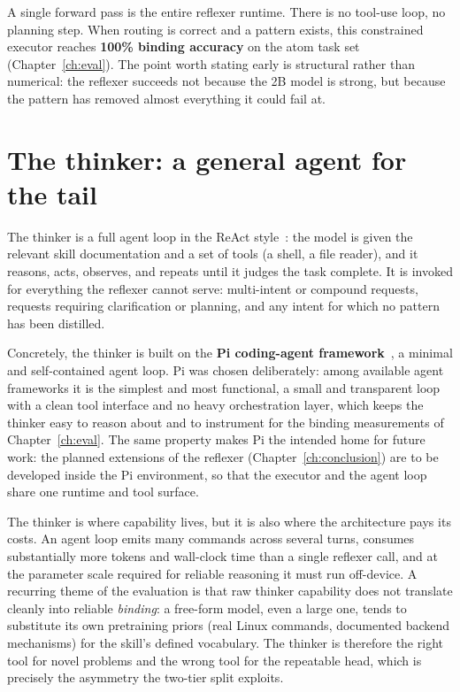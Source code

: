 A single forward pass is the entire reflexer runtime. There is no tool-use loop,
no planning step. When routing is correct and a pattern exists, this
constrained executor reaches \textbf{100\% binding accuracy} on the atom task set
(Chapter~\ref{ch:eval}). The point worth stating early is structural rather than
numerical: the reflexer succeeds not because the 2B model is strong, but because
the pattern has removed almost everything it could fail at.

\section{The thinker: a general agent for the tail}
\label{sec:thinker}

The thinker is a full agent loop in the ReAct style~\citep{yao2022react}: the
model is given the relevant skill documentation and a set of tools (a shell, a
file reader), and it reasons, acts, observes, and repeats until it judges the
task complete. It is invoked for everything the reflexer cannot serve:
multi-intent or compound requests, requests requiring clarification or planning,
and any intent for which no pattern has been distilled.

Concretely, the thinker is built on the \textbf{Pi coding-agent
framework}~\citep{pi-agent}, a minimal and self-contained agent loop. Pi was
chosen deliberately: among available agent frameworks it is the simplest and most
functional, a small and transparent loop with a clean tool interface and no heavy
orchestration layer, which keeps the thinker easy to reason about and to
instrument for the binding measurements of Chapter~\ref{ch:eval}. The same
property makes Pi the intended home for future work: the planned extensions of the
reflexer (Chapter~\ref{ch:conclusion}) are to be developed inside the Pi
environment, so that the executor and the agent loop share one runtime and tool
surface.

The thinker is where capability lives, but it is also where the architecture
pays its costs. An agent loop emits many commands across several turns, consumes
substantially more tokens and wall-clock time than a single reflexer call, and
at the parameter scale required for reliable reasoning it must run off-device.
A recurring theme of the evaluation is that raw thinker capability does not
translate cleanly into reliable \emph{binding}: a free-form model, even a large
one, tends to substitute its own pretraining priors (real Linux commands,
documented backend mechanisms) for the skill's defined vocabulary. The thinker
is therefore the right tool for novel problems and the wrong tool for the
repeatable head, which is precisely the asymmetry the two-tier split exploits.


